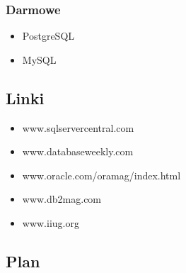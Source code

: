 \documentclass[12pt]{article}
\begin{document}
\subsubsection{Darmowe}
\begin{itemize}
\item PostgreSQL
\item MySQL
\end{itemize}

\subsection{Linki}
\begin{itemize}
\item www.sqlservercentral.com
\item www.databaseweekly.com
\item www.oracle.com/oramag/index.html
\item www.db2mag.com
\item www.iiug.org
\end{itemize}

\subsection{Plan}
\end{document}
